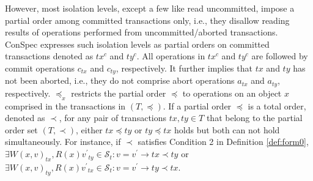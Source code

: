 \documentclass[acmlarge, ,11pt]{acmart}
\begin{document}
    \par However, most isolation levels, except a few like read uncommitted, impose a partial order among committed transactions only, i.e., they disallow reading results of operations performed from uncommitted/aborted transactions. ConSpec expresses such isolation levels as partial orders on committed transactions denoted as $\mathit{tx}^{c}$ and $\mathit{ty}^{c}$.  All operations in $\mathit{tx}^{c}$ and $\mathit{ty}^{c}$ are followed by commit operations $c_\mathit{tx}$ and $c_\mathit{ty}$, respectively. It further implies that $\mathit{tx}$ and $\mathit{ty}$ has not been aborted, i.e., they do not comprise abort operations $a_\mathit{tx}$ and $a_\mathit{ty}$, respectively.  $\preccurlyeq_x$ restricts the partial order $\preccurlyeq$ to operations on an object $x$ comprised in the transactions in $\left( T, \preccurlyeq \right)$. If a partial order $\preccurlyeq$ is a total order, denoted as  $\prec$, for any pair of transactions $\mathit{tx}, \mathit{ty} \in T$ that belong to the partial order set $\left( T, \prec \right)$, either $\mathit{tx} \preccurlyeq \mathit{ty}$ or $\mathit{ty} \preccurlyeq \mathit{tx}$ holds but both can not hold simultaneously. For instance, if $\prec$ satisfies Condition 2 in Definition \ref{def:form0},  
  	$\exists W(x,v)_{\mathit{tx}}, R(x){v^{'}}_{\mathit{ty}} \in  \mathcal{S}_t: %
   v = v^{'}  \rightarrow \mathit{tx} \prec \mathit{ty}$ or $\exists W(x,v)_{\mathit{ty}}, R(x){v^{'}}_{\mathit{tx}} \in  \mathcal{S}_t: %
   v = v^{'}  \rightarrow \mathit{ty} \prec \mathit{tx}$.  %
   
\end{document}
